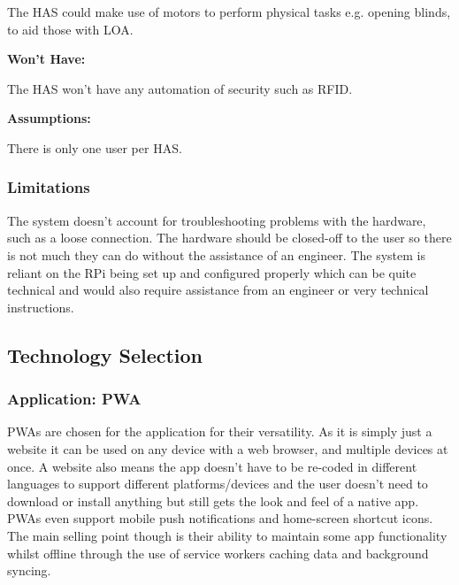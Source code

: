 \documentclass[final]{cmpreport}
\begin{document}
        The HAS could make use of motors to perform physical tasks e.g. opening blinds, to aid those with LOA.
        
        \textbf{Won't Have:}
        
        The HAS won't have any automation of security such as RFID.
        
        \textbf{Assumptions:}
        
        There is only one user per HAS.
        
        \subsubsection{Limitations}
        
        The system doesn't account for troubleshooting problems with the hardware, such as a loose connection. The hardware should be closed-off to the user so there is not much they can do without the assistance of an engineer. 
        The system is reliant on the RPi being set up and configured properly which can be quite technical and would also require assistance from an engineer or very technical instructions.
        
    \subsection{Technology Selection}
    
        
        \subsubsection{Application: PWA}
        
        
        PWAs are chosen for the application for their versatility. As it is simply just a website it can be used on any device with a web browser, and multiple devices at once. A website also means the app doesn't have to be re-coded in different languages to support different platforms/devices and the user doesn't need to download or install anything but still gets the look and feel of a native app. PWAs even support mobile push notifications and home-screen shortcut icons. The main selling point though is their ability to maintain some app functionality whilst offline through the use of service workers caching data and background syncing. %
        
\end{document}

